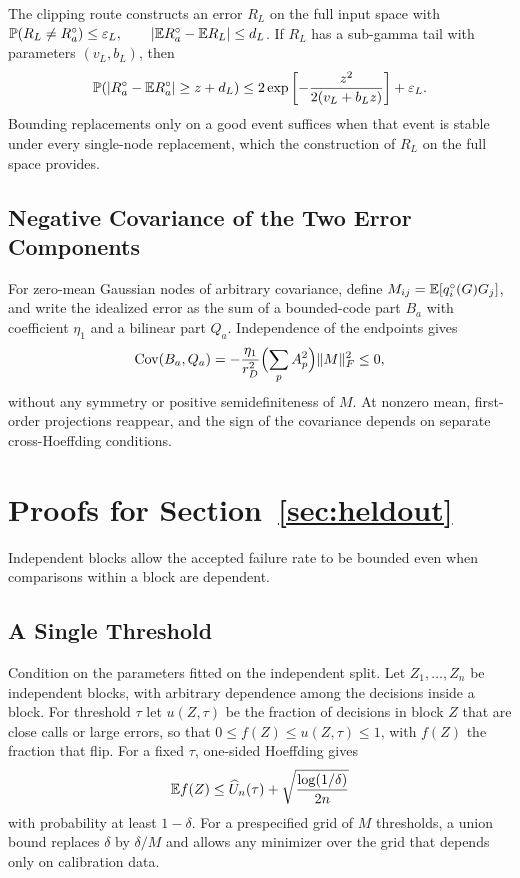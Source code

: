 The clipping route constructs an error $R_L$ on the full input space with
$\mathbb{P}(R_L\ne R_a^\circ)\le\varepsilon_L,\qquad|\mathbb{E} R_a^\circ-\mathbb{E} R_L|\le d_L$.
If $R_L$ has a sub-gamma tail with parameters $(v_L,b_L)$, then
\begin{equation}
\mathbb{P}(|R_a^\circ-\mathbb{E} R_a^\circ|\ge z+d_L)\le2\exp\left[-\frac{z^2}{2(v_L+b_Lz)}\right]+\varepsilon_L.
\end{equation}
Bounding replacements only on a good event suffices when that event is stable under every single-node replacement, which the construction of $R_L$ on the full space provides.

\subsection{Negative Covariance of the Two Error Components}

For zero-mean Gaussian nodes of arbitrary covariance, define $M_{ij}=\mathbb{E}[q_i^\circ(G)G_j]$, and write the idealized error as the sum of a bounded-code part $B_a$ with coefficient $\eta_1$ and a bilinear part $Q_a$. Independence of the endpoints gives
\begin{equation}
\operatorname{Cov}(B_a,Q_a)=-\frac{\eta_1}{r_D^2}\Bigl(\sum_pA_p^2\Bigr)\|M\|_F^2\le0,
\end{equation}
without any symmetry or positive semidefiniteness of $M$. At nonzero mean, first-order projections reappear, and the sign of the covariance depends on separate cross-Hoeffding conditions.

\section{Proofs for Section~\ref{sec:heldout}}
\label{app:p6}

Independent blocks allow the accepted failure rate to be bounded even when comparisons within a block are dependent.

\subsection{A Single Threshold}

Condition on the parameters fitted on the independent split. Let $Z_1,\ldots,Z_n$ be independent blocks, with arbitrary dependence among the decisions inside a block. For threshold $\tau$ let $u(Z,\tau)$ be the fraction of decisions in block $Z$ that are close calls or large errors, so that $0\le f(Z)\le u(Z,\tau)\le1$, with $f(Z)$ the fraction that flip. For a fixed $\tau$, one-sided Hoeffding gives
\begin{equation}
\mathbb{E} f(Z)\le\widehat U_n(\tau)+\sqrt{\frac{\log(1/\delta)}{2n}}
\end{equation}
with probability at least $1-\delta$. For a prespecified grid of $M$ thresholds, a union bound replaces $\delta$ by $\delta/M$ and allows any minimizer over the grid that depends only on calibration data.

